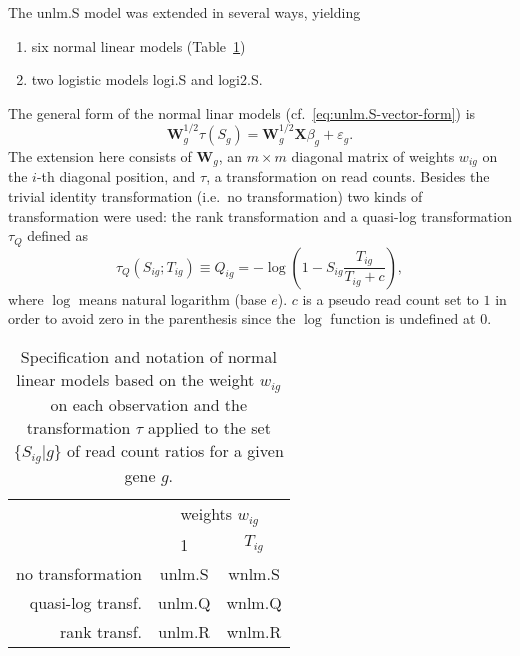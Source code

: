 \documentclass[12pt,letterpaper]{article}
\begin{document}
The unlm.S model was extended in several ways, yielding
\begin{enumerate}
\item six normal linear models (Table~\ref{tab:nlm})
\item two logistic models logi.S and logi2.S.
\end{enumerate}

The general form of the normal linar models
(cf.~\ref{eq:unlm.S-vector-form}) is
\begin{equation}
\mathbf{W}_g^{1/2} \tau(S_g) = \mathbf{W}_g^{1/2} \mathbf{X} \beta_g + \varepsilon_g.
\label{eq:nlm-general}
\end{equation}
The extension here consists of \(\mathbf{W}_g\), an \(m\times m\) diagonal matrix of
weights \(w_{ig}\) on the \(i\)-th diagonal position, and \(\tau\), a
transformation on read counts.  Besides the trivial identity transformation
(i.e.~no transformation) two kinds of transformation were used: the rank
transformation and a quasi-log transformation \(\tau_Q\) defined as
\begin{equation}
\tau_Q(S_{ig};T_{ig}) \equiv Q_{ig} = - \log \left( 1 - S_{ig} \frac{T_{ig}}{T_{ig} + c}
\right),
\label{eq:Q}
\end{equation}
where \(\log\) means natural logarithm (base \(e\)).  \(c\) is a pseudo read
count set to \(1\) in order to avoid zero in the parenthesis since the \(\log\)
function is undefined at \(0\).

\begin{table}
\begin{center}
\begin{tabular}{r|cc}
 & \multicolumn{2}{c}{weights \(w_{ig}\)} \\
 & 1 & \(T_{ig}\) \\
\hline
no transformation & unlm.S & wnlm.S \\
quasi-log transf. & unlm.Q & wnlm.Q \\
rank transf. & unlm.R & wnlm.R \\
\end{tabular}
\end{center}
\caption{Specification and notation of normal linear models based on the weight
\(w_{ig}\) on each observation and the
transformation \(\tau\) applied to the set \(\{S_{ig} | g\}\) of read count
ratios for a given gene \(g\).}
\label{tab:nlm}
\end{table}
\end{document}
